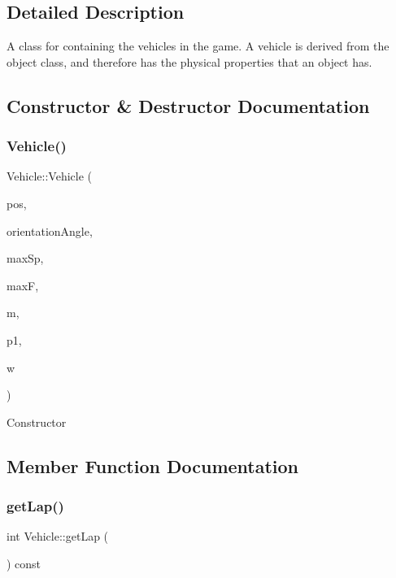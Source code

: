 \subsection{Detailed Description}
A class for containing the vehicles in the game. A vehicle is derived from the object class, and therefore has the physical properties that an object has. 

\subsection{Constructor \& Destructor Documentation}
\hypertarget{classVehicle_a60b696997b412b5dd48728bbc3f56dce}{}\label{classVehicle_a60b696997b412b5dd48728bbc3f56dce} 
\subsubsection{\texorpdfstring{Vehicle()}{Vehicle()}}
{\footnotesize\ttfamily Vehicle\+::\+Vehicle (\begin{DoxyParamCaption}\item[{Vector2d}]{pos,  }\item[{double}]{orientation\+Angle,  }\item[{double}]{max\+Sp,  }\item[{double}]{maxF,  }\item[{double}]{m,  }\item[{std\+::shared\+\_\+ptr$<$ \hyperlink{classPlayerInput}{Player\+Input} $>$}]{p1,  }\item[{std\+::shared\+\_\+ptr$<$ \hyperlink{classWorld}{World} $>$}]{w }\end{DoxyParamCaption})}

Constructor 

\subsection{Member Function Documentation}
\hypertarget{classVehicle_aa3ec0152e6944dcd9e3b219dbf4fbba5}{}\label{classVehicle_aa3ec0152e6944dcd9e3b219dbf4fbba5} 
\subsubsection{\texorpdfstring{get\+Lap()}{getLap()}}
{\footnotesize\ttfamily int Vehicle\+::get\+Lap (\begin{DoxyParamCaption}{ }\end{DoxyParamCaption}) const\hspace{0.3cm}{\ttfamily [inline]}}

